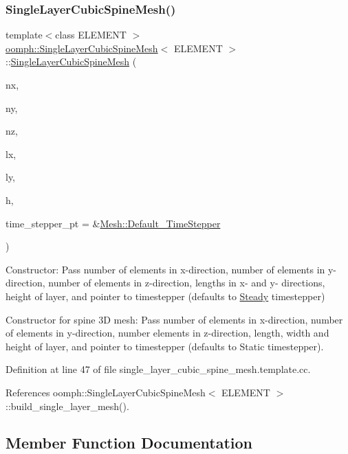 \subsubsection{\texorpdfstring{Single\+Layer\+Cubic\+Spine\+Mesh()}{SingleLayerCubicSpineMesh()}}
{\footnotesize\ttfamily template$<$class E\+L\+E\+M\+E\+NT $>$ \\
\hyperlink{classoomph_1_1SingleLayerCubicSpineMesh}{oomph\+::\+Single\+Layer\+Cubic\+Spine\+Mesh}$<$ E\+L\+E\+M\+E\+NT $>$\+::\hyperlink{classoomph_1_1SingleLayerCubicSpineMesh}{Single\+Layer\+Cubic\+Spine\+Mesh} (\begin{DoxyParamCaption}\item[{const unsigned \&}]{nx,  }\item[{const unsigned \&}]{ny,  }\item[{const unsigned \&}]{nz,  }\item[{const double \&}]{lx,  }\item[{const double \&}]{ly,  }\item[{const double \&}]{h,  }\item[{\hyperlink{classoomph_1_1TimeStepper}{Time\+Stepper} $\ast$}]{time\+\_\+stepper\+\_\+pt = {\ttfamily \&\hyperlink{classoomph_1_1Mesh_a12243d0fee2b1fcee729ee5a4777ea10}{Mesh\+::\+Default\+\_\+\+Time\+Stepper}} }\end{DoxyParamCaption})}



Constructor\+: Pass number of elements in x-\/direction, number of elements in y-\/direction, number of elements in z-\/direction, lengths in x-\/ and y-\/ directions, height of layer, and pointer to timestepper (defaults to \hyperlink{classoomph_1_1Steady}{Steady} timestepper) 

Constructor for spine 3D mesh\+: Pass number of elements in x-\/direction, number of elements in y-\/direction, number elements in z-\/direction, length, width and height of layer, and pointer to timestepper (defaults to Static timestepper). 

Definition at line 47 of file single\+\_\+layer\+\_\+cubic\+\_\+spine\+\_\+mesh.\+template.\+cc.



References oomph\+::\+Single\+Layer\+Cubic\+Spine\+Mesh$<$ E\+L\+E\+M\+E\+N\+T $>$\+::build\+\_\+single\+\_\+layer\+\_\+mesh().



\subsection{Member Function Documentation}
\mbox{\label{classoomph_1_1SingleLayerCubicSpineMesh_a975e6943dbdcf2474c78261d3ec00f28}} 
